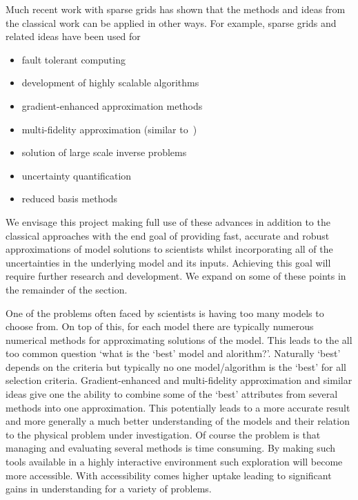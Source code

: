 \documentclass[a4paper,fontsize=12pt]{scrartcl}
\begin{document}
Much recent work with sparse grids has shown that the methods and ideas
from the classical work can be applied in other ways.
For example, sparse grids and related ideas have been used for
\begin{itemize}
\item fault tolerant computing~\cite{HardingHLS2015,AliEtal2015}
\item development of highly scalable algorithms~\cite{StrazdinsEtal2015}
\item gradient-enhanced approximation methods~\cite{deBaarHarding2015,Jakeman2015}
\item multi-fidelity approximation (similar to~\cite{deBaarRDM2015}) 
\item solution of large scale inverse problems~\cite{Zabaras2010}
\item uncertainty quantification~\cite{JakemanRoberts2013,FranzelinDiehlPfluger2014}
\item reduced basis methods~\cite{Peherstorfer2013,ChenSchwab2015}
\end{itemize}
We envisage this project making full use of these advances in addition 
to the classical approaches with the end goal of providing fast, accurate
and robust approximations of model solutions to scientists whilst 
incorporating all of the uncertainties in the underlying model and its inputs. 
Achieving this goal will require further research and development.
We expand on some of these points in the remainder of the section.

One of the problems often faced by scientists is having too many models 
to choose from. On top of this, for each model there are typically numerous
numerical methods for approximating solutions of the model.
This leads to the all too common question `what is the `best' model and alorithm?'.
Naturally `best' depends on the criteria but typically no one model/algorithm is
the `best' for all selection criteria.
Gradient-enhanced and multi-fidelity approximation and similar ideas give one
the ability to combine some of the `best' attributes from several methods into one approximation.
This potentially leads to a more accurate result and more generally a much better
understanding of the models and their relation to the physical problem under investigation.
Of course the problem is that managing and evaluating several methods is time
consuming. By making such tools available in a highly interactive environment
such exploration will become more accessible. With accessibility comes higher 
uptake leading to significant gains in understanding for a variety of problems.
\end{document}
